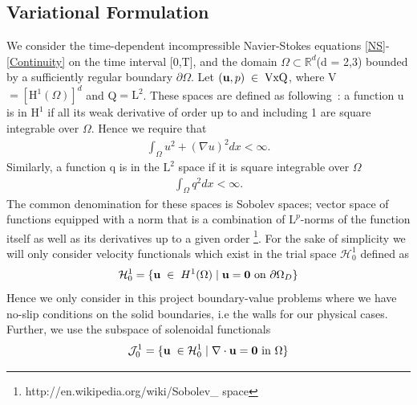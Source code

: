 \documentclass[11pt]{article}
\begin{document}
{%
\subsection{Variational Formulation}
We consider the time-dependent incompressible Navier-Stokes equations 
\eqref{NS}-\eqref{Continuity} on the time interval [0,T], and the domain $\Omega 
\subset\mathbb{R}^d $(d = 2,3) bounded by a sufficiently regular boundary $\partial 
\Omega$. Let $(\mathbf{u},p)\hspace{1mm}\in\hspace{1mm} \text{VxQ}$, where V 
$= [\text{H}^1(\Omega)]^d$ and Q$=\text{L}^2$.  These spaces are defined as 
\mbox{following :} a function u is in $\text{H}^1$ if all its weak derivative of order 
up to and including 1 are square integrable over $\Omega$. Hence we require that
\begin{align*} 
\int_\Omega u^2 + (\nabla u)^2 dx < \infty.
\end{align*}
Similarly, a function q is in the $\text{L}^2$ space if it is square integrable over $\Omega$ 
\begin{align*} 
\int_\Omega q^2 dx < \infty.
\end{align*}
The common denomination for these spaces is Sobolev spaces;  vector space of functions 
equipped with a norm that is a combination of $\text{L}^p$-norms of the function itself 
as well as its derivatives up to a given order
\footnote{http://en.wikipedia.org/wiki/Sobolev\hspace{-0.5mm}\_ \hspace{-0.65mm}space}. 
For the sake of simplicity we will only consider velocity functionals which exist in the trial 
space $\mathcal{H}^1_0$ defined as
\begin{align*}
\mathcal{H}^1_0 = \{ \mathbf{u} \hspace{1mm}\in\hspace{1mm} 
H^1(\Omega)\hspace{1mm} |\hspace{1mm} \mathbf{u} = \mathbf{0} \text{ on } \partial \Omega_D \}
\end{align*}
Hence we only consider in this project boundary-value problems where we have no-slip conditions
on the solid boundaries, i.e the walls for our physical cases. Further, we use the subspace of 
solenoidal functionals
\begin{align*}
\mathcal{J}^1_0 = \{ \mathbf{u} \hspace{1mm}\in\mathcal{H}^1_0\hspace{1mm} |\hspace{1mm} 
\nabla\cdot\mathbf{u} = \mathbf{0} \text{ in } \Omega \}
\end{align*}

}
\end{document}
